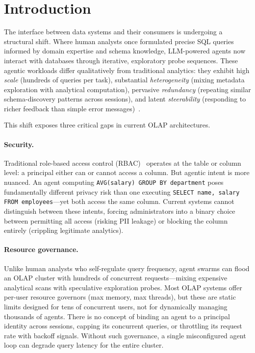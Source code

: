 \documentclass[sigconf, nonacm]{acmart}
\begin{document}
\maketitle

\section{Introduction}
\label{sec:intro}

The interface between data systems and their consumers is undergoing a
structural shift. Where human analysts once formulated precise SQL queries
informed by domain expertise and schema knowledge, LLM-powered agents now
interact with databases through iterative, exploratory probe
sequences. These agentic workloads differ qualitatively from
traditional analytics: they exhibit high \emph{scale} (hundreds of queries per
task), substantial \emph{heterogeneity} (mixing metadata exploration with
analytical computation), pervasive \emph{redundancy} (repeating similar
schema-discovery patterns across sessions), and latent
\emph{steerability} (responding to richer feedback than simple error
messages)~\cite{liu2025sao}.

This shift exposes three critical gaps in current OLAP architectures.

\paragraph{Security.}
Traditional role-based access control (RBAC)~\cite{sandhu1996rbac} operates at
the table or column level: a principal either can or cannot access a column.
But agentic intent is more nuanced. An agent computing \texttt{AVG(salary)
GROUP BY department} poses fundamentally different privacy risk than one
executing \texttt{SELECT name, salary FROM employees}---yet both access the
same column. Current systems cannot distinguish between these intents, forcing
administrators into a binary choice between permitting all access (risking PII
leakage) or blocking the column entirely (crippling legitimate analytics).

\paragraph{Resource governance.}
Unlike human analysts who self-regulate query frequency, agent swarms can flood
an OLAP cluster with hundreds of concurrent requests---mixing expensive
analytical scans with speculative exploration probes.  Most OLAP systems offer
per-user resource governors (max memory, max threads), but these are static
limits designed for tens of concurrent users, not for dynamically managing
thousands of agents.  There is no concept of binding an agent to a principal
identity across sessions, capping its concurrent queries, or throttling its
request rate with backoff signals.  Without such governance, a single
misconfigured agent loop can degrade query latency for the entire cluster.
\end{document}
